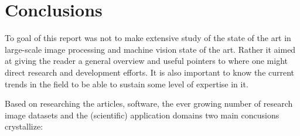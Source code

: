 \section{Conclusions}
\label{sec:conc}

To goal of  this report was not to make extensive study of the state of the art in large-scale image processing and machine vision state of the art. Rather it aimed at giving the reader a general overview and useful pointers to where one might direct research and development efforts. It is also important to know the current trends in the field to be able to sustain some level of expertise in it.

Based on researching the articles, software, the ever growing number of research image datasets and the (scientific) application domains two main concusions crystallize:

